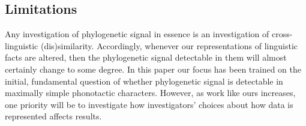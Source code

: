 \hypertarget{limitations}{%
\subsection{Limitations}\label{limitations}}

Any investigation of phylogenetic signal in essence is an investigation of cross-linguistic (dis)similarity. Accordingly, whenever our representations of linguistic facts are altered, then the phylogenetic signal detectable in them will almost certainly change to some degree. In this paper our focus has been trained on the initial, fundamental question of whether phylogenetic signal is detectable in maximally simple phonotactic characters. However, as work like ours increases, one priority will be to investigate how investigators' choices about how data is represented affects results.

